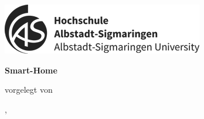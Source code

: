 \begin{titlepage}\linespread{1.5}\selectfont

  \includegraphics[width=.5\linewidth]{Graphics/logo}


  \begin{center}
    \large  
    \hfill
    \vfill
    \begingroup
      \huge\bfseries Smart-Home\\
      \Large\bfseries\myTitle 
    \endgroup
		
		\bigskip
		
    
  \vfill
	
	
	\bigskip
	
  vorgelegt von \\
  \myName
	
	
  \vfill
	
  \myLocation, \myTime                   

    \end{center}       
\end{titlepage}   